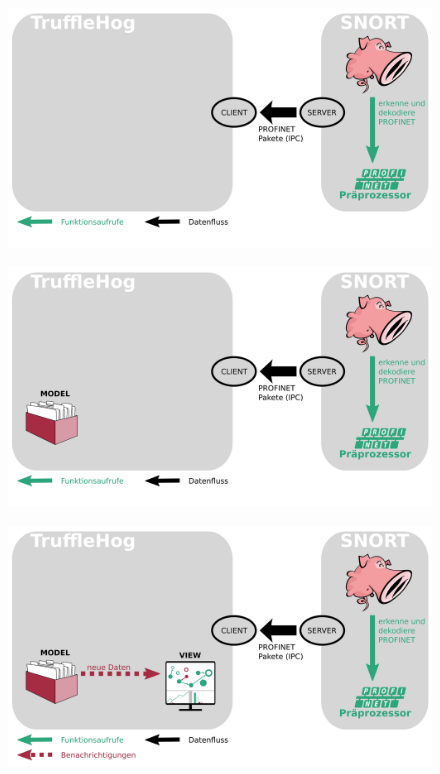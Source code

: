 \documentclass[18pt]{beamer}
\begin{document}
\begin{frame}
    \begin{figure}
    	\centering
    	\includegraphics[width=\textwidth]{./images/jan_6.png}
    \end{figure}
\end{frame}

\begin{frame}
    \begin{figure}
    	\centering
    	\includegraphics[width=\textwidth]{./images/jan_7.png}
    \end{figure}
\end{frame}

\begin{frame}
    \begin{figure}
    	\centering
    	\includegraphics[width=\textwidth]{./images/jan_8.png}
    \end{figure}
\end{frame}
\end{document}
